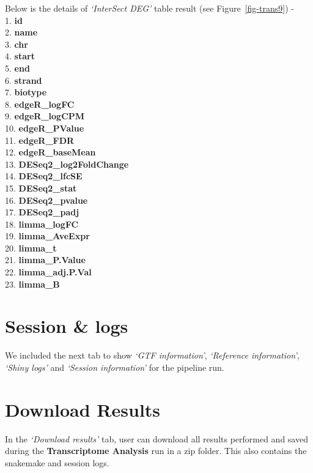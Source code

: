 \documentclass[
  a4paper,
  DIV=11,
  numbers=noendperiod,
  oneside,
  open=any]{scrreport}
\begin{document}
Below is the details of \emph{`InterSect DEG'} table result (see
Figure~\ref{fig-trans9}) -\\
1. \textbf{id}\\
2. \textbf{name}\\
3. \textbf{chr}\\
4. \textbf{start}\\
5. \textbf{end}\\
6. \textbf{strand}\\
7. \textbf{biotype}\\
8. \textbf{edgeR\_logFC}\\
9. \textbf{edgeR\_logCPM}\\
10. \textbf{edgeR\_PValue}\\
11. \textbf{edgeR\_FDR}\\
12. \textbf{edgeR\_baseMean}\\
13. \textbf{DESeq2\_log2FoldChange}\\
14. \textbf{DESeq2\_lfcSE}\\
15. \textbf{DESeq2\_stat}\\
16. \textbf{DESeq2\_pvalue}\\
17. \textbf{DESeq2\_padj}\\
18. \textbf{limma\_logFC}\\
19. \textbf{limma\_AveExpr}\\
20. \textbf{limma\_t}\\
21. \textbf{limma\_P.Value}\\
22. \textbf{limma\_adj.P.Val}\\
23. \textbf{limma\_B}

\section{Session \& logs}\label{session-logs}

We included the next tab to show \emph{`GTF information'},
\emph{`Reference information'}, \emph{`Shiny logs'} and \emph{`Session
information'} for the pipeline run.

\section{Download Results}\label{download-results}

In the \emph{`Download results'} tab, user can download all results
performed and saved during the \textbf{Transcriptome Analysis} run in a
zip folder. This also contains the snakemake and session logs.
\end{document}
